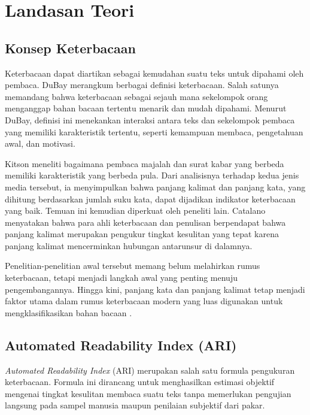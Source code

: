 \chapter{Landasan Teori}
\label{chap:teori}

\section{Konsep Keterbacaan}
Keterbacaan dapat diartikan sebagai kemudahan suatu teks untuk dipahami oleh pembaca. DuBay \cite{dubay2004principles} merangkum berbagai
definisi keterbacaan. Salah satunya memandang bahwa keterbacaan sebagai sejauh mana sekelompok orang
menganggap bahan bacaan tertentu menarik dan mudah dipahami. Menurut
DuBay, definisi ini menekankan interaksi antara teks dan sekelompok
pembaca yang memiliki karakteristik tertentu, seperti kemampuan membaca,
pengetahuan awal, dan motivasi.

Kitson \cite{kitson1921mind} meneliti bagaimana pembaca majalah dan surat kabar yang berbeda memiliki karakteristik yang berbeda pula. Dari analisisnya terhadap kedua jenis media tersebut, ia menyimpulkan bahwa panjang kalimat dan panjang kata, yang dihitung berdasarkan jumlah suku kata, dapat dijadikan indikator keterbacaan yang baik. Temuan ini kemudian diperkuat oleh peneliti lain. Catalano \cite{catalano1990wire} menyatakan bahwa para ahli keterbacaan dan penulisan berpendapat bahwa panjang kalimat merupakan pengukur tingkat kesulitan yang tepat karena panjang kalimat mencerminkan hubungan antarunsur di dalamnya.

Penelitian-penelitian awal tersebut memang belum melahirkan rumus keterbacaan, tetapi menjadi langkah awal yang penting menuju pengembangannya. Hingga kini, panjang kata dan panjang kalimat tetap menjadi faktor utama dalam rumus keterbacaan modern yang luas digunakan untuk mengklasifikasikan bahan bacaan \cite{zamanian2012readability}.

\section{Automated Readability Index (ARI)}

\textit{Automated Readability Index} (ARI) merupakan salah satu formula pengukuran keterbacaan. Formula ini dirancang untuk menghasilkan estimasi objektif mengenai tingkat kesulitan membaca suatu teks tanpa memerlukan pengujian langsung pada sampel manusia maupun penilaian subjektif dari pakar.


